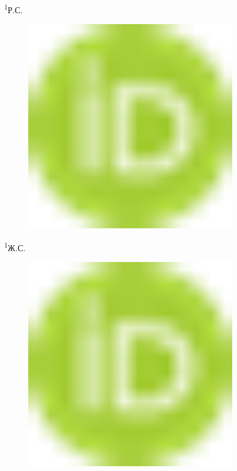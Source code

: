 {\textsuperscript{1}Р.С.
\begin{figure}[H]
	\centering
	\includegraphics[width=0.8\textwidth]{media/ekon/image1}
	\caption*{}
\end{figure}

\textsuperscript{1}Ж.С.
\begin{figure}[H]
	\centering
	\includegraphics[width=0.8\textwidth]{media/ekon/image1}
	\caption*{}
\end{figure}


}
